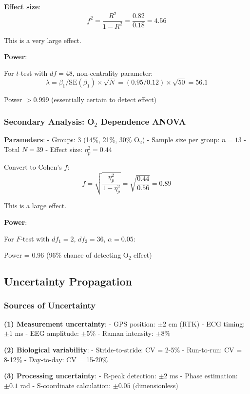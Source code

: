 \documentclass[11pt,onecolumn]{article}
\begin{document}
\textbf{Effect size}:
\begin{equation}
f^2 = \frac{R^2}{1 - R^2} = \frac{0.82}{0.18} = 4.56
\end{equation}

This is a very large effect.

\textbf{Power}:

For $t$-test with $df = 48$, non-centrality parameter:
\begin{equation}
\lambda = \beta_1 / \text{SE}(\beta_1) \times \sqrt{N} = (0.95/0.12) \times \sqrt{50} = 56.1
\end{equation}

Power $> 0.999$ (essentially certain to detect effect)

\subsubsection{Secondary Analysis: O$_2$ Dependence ANOVA}

\textbf{Parameters}:
- Groups: 3 (14\%, 21\%, 30\% O$_2$)
- Sample size per group: $n = 13$
- Total $N = 39$
- Effect size: $\eta_p^2 = 0.44$

Convert to Cohen's $f$:
\begin{equation}
f = \sqrt{\frac{\eta_p^2}{1 - \eta_p^2}} = \sqrt{\frac{0.44}{0.56}} = 0.89
\end{equation}

This is a large effect.

\textbf{Power}:

For $F$-test with $df_1 = 2$, $df_2 = 36$, $\alpha = 0.05$:

Power = 0.96 (96\% chance of detecting O$_2$ effect)

\subsection{Uncertainty Propagation}

\subsubsection{Sources of Uncertainty}

\textbf{(1) Measurement uncertainty}:
- GPS position: $\pm 2$ cm (RTK)
- ECG timing: $\pm 1$ ms
- EEG amplitude: $\pm 5\%$
- Raman intensity: $\pm 8\%$

\textbf{(2) Biological variability}:
- Stride-to-stride: CV = 2-5\%
- Run-to-run: CV = 8-12\%
- Day-to-day: CV = 15-20\%

\textbf{(3) Processing uncertainty}:
- R-peak detection: $\pm 2$ ms
- Phase estimation: $\pm 0.1$ rad
- S-coordinate calculation: $\pm 0.05$ (dimensionless)
\end{document}
